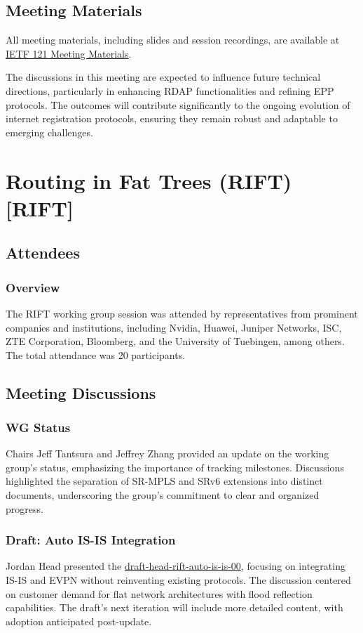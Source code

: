 \documentclass{article}
\begin{document}
\subsection{Meeting Materials}
All meeting materials, including slides and session recordings, are available at \href{https://datatracker.ietf.org/meeting/121/materials/}{IETF 121 Meeting Materials}.

The discussions in this meeting are expected to influence future technical directions, particularly in enhancing RDAP functionalities and refining EPP protocols. The outcomes will contribute significantly to the ongoing evolution of internet registration protocols, ensuring they remain robust and adaptable to emerging challenges.



\newpage

\section{Routing in Fat Trees (RIFT) [RIFT]}

\subsection{Attendees}
\subsubsection{Overview}
The RIFT working group session was attended by representatives from prominent companies and institutions, including Nvidia, Huawei, Juniper Networks, ISC, ZTE Corporation, Bloomberg, and the University of Tuebingen, among others. The total attendance was 20 participants.

\subsection{Meeting Discussions}

\subsubsection{WG Status}
Chairs Jeff Tantsura and Jeffrey Zhang provided an update on the working group's status, emphasizing the importance of tracking milestones. Discussions highlighted the separation of SR-MPLS and SRv6 extensions into distinct documents, underscoring the group's commitment to clear and organized progress.

\subsubsection{Draft: Auto IS-IS Integration}
Jordan Head presented the \href{https://datatracker.ietf.org/doc/html/draft-ietf-rift-auto-is-is-00}{draft-head-rift-auto-is-is-00}, focusing on integrating IS-IS and EVPN without reinventing existing protocols. The discussion centered on customer demand for flat network architectures with flood reflection capabilities. The draft's next iteration will include more detailed content, with adoption anticipated post-update.
\end{document}
